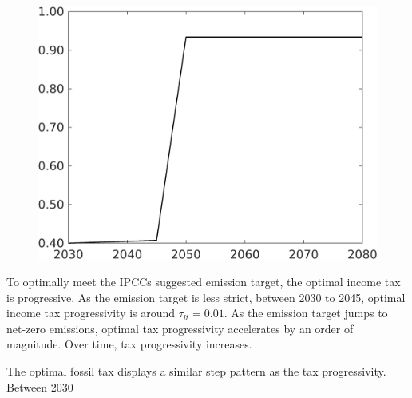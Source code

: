 \begin{figure}[h!!]
\begin{minipage}[]{0.4\textwidth}
		\includegraphics[width=1\textwidth]{../../codding_model/own_basedOnFried/optimalPol_elastS_DisuSci/figures/all_1705/Single_OPT_T_NoTaus_tauf_spillover0_sep1_etaa1.00.png}
	\end{minipage}
\end{figure} 
To optimally meet the IPCCs suggested emission target, the optimal income tax is progressive. As the emission target is less strict, between 2030 to 2045, optimal income tax progressivity is around $\tau_{lt}=0.01$. As the emission target jumps to net-zero emissions, optimal tax progressivity accelerates by an order of magnitude. Over time, tax progressivity increases.  

The optimal fossil tax displays a similar step pattern as the tax progressivity. Between 2030
